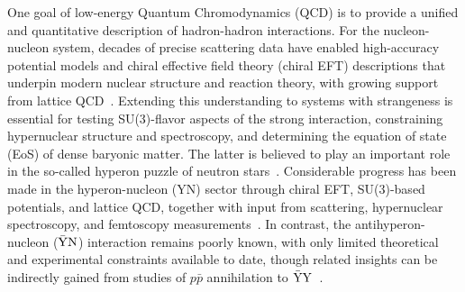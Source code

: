 \documentclass[prd,aps,reprint,noeprint,superscriptaddress,amsmath, amssymb]{revtex4-1}
\begin{document}
One goal of low-energy Quantum Chromodynamics (QCD) is to provide a unified and quantitative description of hadron-hadron interactions.
For the nucleon-nucleon system, decades of precise scattering data have enabled high-accuracy potential models and chiral effective field theory (chiral EFT) descriptions that underpin modern nuclear structure and reaction theory,
with growing support from lattice QCD~\cite{Machleidt2011,Epelbaum2009,Wiringa1995}.
Extending this understanding to systems with strangeness is essential for testing SU(3)-flavor aspects of the strong interaction,
constraining hypernuclear structure and spectroscopy, and determining the equation of state (EoS) of dense baryonic matter.
The latter is believed to play an important role in the so-called hyperon puzzle of neutron stars~\cite{Oertel2017,Demorest2010,Antoniadis2013,Cromartie2020,Lonardoni2015}.
Considerable progress has been made in the hyperon-nucleon (YN) sector through chiral EFT, SU(3)-based potentials, and lattice QCD,
together with input from scattering, hypernuclear spectroscopy,
and femtoscopy measurements~\cite{Haidenbauer2013,Gal2016,Rijken2010,Tolos2020}.
In contrast, the antihyperon-nucleon ($\rm \bar{Y}N$) interaction remains poorly known,
with only limited theoretical and experimental constraints available to date, though related insights can be indirectly gained from studies of $p\bar{p}$ annihilation to $\rm \bar{Y}Y$~\cite{Barnes:1987aw, Barnes:1990wh, Timmermans:1992fu, Haidenbauer:1992hv, Kohno:1987uj}.
\end{document}
